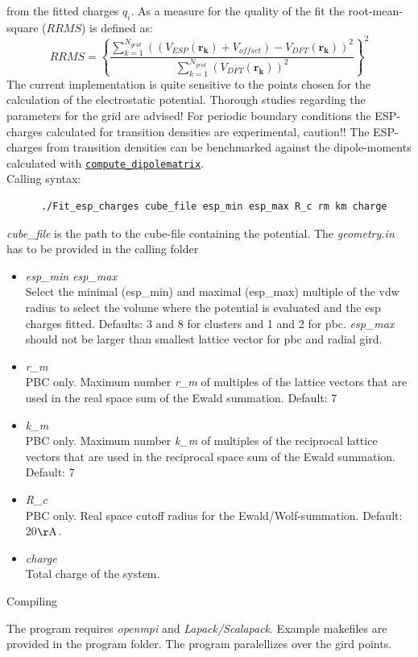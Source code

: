 \documentclass[12pt,a4paper,twoside,openany,titlepage,final]{book}
\newcommand{\keyword}[1]
{\hyperlink{#1}{\texttt{#1}}}
\begin{document}
from the fitted charges $q_i$. As a measure for the quality of the fit the root-mean-square ($RRMS$) is defined as:
\begin{equation}
 RRMS=\left\{\frac{\sum_{k=1}^{N_{grid}}\left(\left(V_{ESP}(\mathbf{r_k})+V_{offset}\right)-V_{DFT}(\mathbf{r_k})\right)^2}{\sum_{k=1}^{N_{grid}}\left(V_{DFT}(\mathbf{r_k})\right)^2}\right\}^2
\end{equation}
The current implementation is quite sensitive to the points chosen for the calculation of the electrostatic potential. Thorough studies 
regarding the parameters for the grid are advised! For periodic boundary conditions the ESP-charges calculated for transition densities 
are experimental, caution!! The ESP-charges from transition densities can be benchmarked against the dipole-moments calculated with 
\keyword{compute\_dipolematrix}.\\

Calling syntax: 
\begin{verbatim}
      ./Fit_esp_charges cube_file esp_min esp_max R_c rm km charge 
\end{verbatim}
\textit{cube\_file} is the path to the cube-file containing the potential. The \textit{geometry.in} has to be provided in the calling folder


\begin{itemize}
\item \textit{esp\_min esp\_max} \\
  Select the minimal (esp\_min) and maximal (esp\_max) multiple of the vdw radius to select the volume where the 
  potential is evaluated and the esp charges fitted. Defaults: 3 and 8 for clusters and 1 and 2 for pbc. \textit{esp\_max} should not 
  be larger than smallest lattice vector for pbc and radial gird.
\item \textit{r\_m} \\
  PBC only. Maximum number \textit{r\_m} of multiples of the lattice vectors that are used in the real space sum of the Ewald summation. 
  Default: 7
\item \textit{k\_m} \\
  PBC only. Maximum number \textit{k\_m} of multiples of the reciprocal lattice vectors that are used in the reciprocal space sum of the Ewald summation. 
  Default: 7
\item \textit{R\_c} \\
  PBC only. Real space cutoff radius for the Ewald/Wolf-summation. Default: 20$\mathrm{\AA}$.
\item  \textit{charge} \\
  Total charge of the system.

  \end{itemize}
  
\begin{large}
 Compiling\\
\end{large}

The program requires \textit{openmpi} and \textit{Lapack/Scalapack}. Example makefiles are provided in the program folder. The program paralellizes over the gird points.

\end{document}
